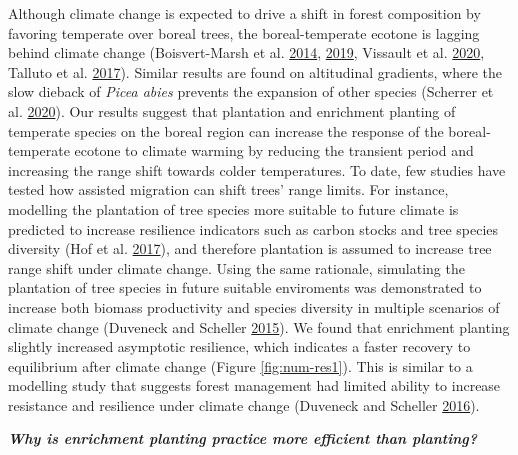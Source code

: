 \documentclass[12pt]{article}
\begin{document}
Although climate change is expected to drive a shift in forest
composition by favoring temperate over boreal trees, the
boreal-temperate ecotone is lagging behind climate change
(Boisvert-Marsh et al. \protect\hyperlink{ref-BoisvertMarsh2014}{2014},
\protect\hyperlink{ref-BoisvertMarsh2019}{2019}, Vissault et al.
\protect\hyperlink{ref-Vissault2020}{2020}, Talluto et al.
\protect\hyperlink{ref-Talluto2017}{2017}). Similar results are found on
altitudinal gradients, where the slow dieback of \emph{Picea abies}
prevents the expansion of other species (Scherrer et al.
\protect\hyperlink{ref-Scherrer2020}{2020}). Our results suggest that
plantation and enrichment planting of temperate species on the boreal
region can increase the response of the boreal-temperate ecotone to
climate warming by reducing the transient period and increasing the
range shift towards colder temperatures. To date, few studies have
tested how assisted migration can shift trees' range limits. For
instance, modelling the plantation of tree species more suitable to
future climate is predicted to increase resilience indicators such as
carbon stocks and tree species diversity (Hof et al.
\protect\hyperlink{ref-Hof2017}{2017}), and therefore plantation is
assumed to increase tree range shift under climate change. Using the
same rationale, simulating the plantation of tree species in future
suitable enviroments was demonstrated to increase both biomass
productivity and species diversity in multiple scenarios of climate
change (Duveneck and Scheller
\protect\hyperlink{ref-Duveneck2015}{2015}). We found that enrichment
planting slightly increased asymptotic resilience, which indicates a
faster recovery to equilibrium after climate change (Figure
\ref{fig:num-res1}). This is similar to a modelling study that suggests
forest management had limited ability to increase resistance and
resilience under climate change (Duveneck and Scheller
\protect\hyperlink{ref-Duveneck2016}{2016}).

\textbf{\emph{Why is enrichment planting practice more efficient than
planting?}}
\end{document}
